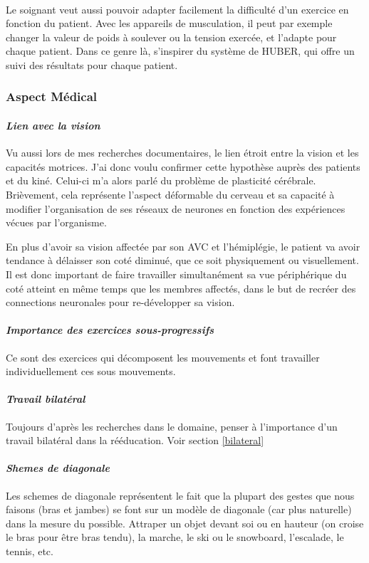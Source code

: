 \paragraph{}Le soignant veut aussi pouvoir adapter facilement la difficulté d'un exercice en fonction du patient. Avec les appareils de musculation, il peut par exemple changer la valeur de poids à soulever ou la tension exercée, et l'adapte pour chaque patient.
Dans ce genre là, s'inspirer du système de HUBER, qui offre un suivi des résultats pour chaque patient.

	\subsubsection*{Aspect Médical}

		\paragraph{\emph{Lien avec la vision}\\}
Vu aussi lors de mes recherches documentaires, le lien étroit entre la vision et les capacités motrices. J'ai donc voulu confirmer cette hypothèse auprès des patients et du kiné. Celui-ci m'a alors parlé du problème de plasticité cérébrale. Brièvement, cela représente l'aspect déformable du cerveau et sa capacité à modifier l'organisation de ses réseaux de neurones en fonction des expériences vécues par l'organisme. 

En plus d'avoir sa vision affectée par son AVC et l'hémiplégie, le patient va avoir tendance à délaisser son coté diminué, que ce soit physiquement ou visuellement. Il est donc important de faire travailler simultanément sa vue périphérique du coté atteint en même temps que les membres affectés, dans le but de recréer des connections neuronales pour re-développer sa vision.

		\paragraph{\emph{Importance des exercices sous-progressifs}\\}
Ce sont des exercices qui décomposent les mouvements et font travailler individuellement ces sous mouvements.

		\paragraph{\emph{Travail bilatéral}\\}
Toujours d'après les recherches dans le domaine, penser à l'importance d'un travail bilatéral dans la rééducation. Voir section \ref{bilateral}


		\paragraph{\emph{Shemes de diagonale}\\}
Les schemes de diagonale représentent le fait que la plupart des gestes que nous faisons (bras et jambes) se font sur un modèle de diagonale (car plus naturelle) dans la mesure du possible. Attraper un objet devant soi ou en hauteur (on croise le bras pour être bras tendu), la marche, le ski ou le snowboard, l'escalade, le tennis, etc.	
	
